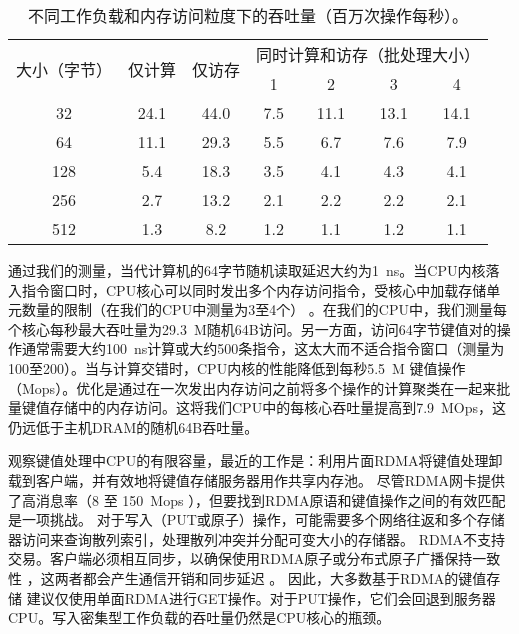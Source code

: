\begin{table}[htbp]
	\small
	\centering
	\label{kvdirect:tab:tput-unroll}
	\begin{tabular}{|c|c|c|c|c|c|c|}
		\hline
		\multirow{2}{*}{大小（字节）} & \multirow{2}{*}{仅计算} & \multirow{2}{*}{仅访存} & \multicolumn{4}{c|}{同时计算和访存（批处理大小）} \\\cline{4-7} 
		&  & & 1 & 2 & 3 & 4 \\\hline
		32 & 24.1 & 44.0 & 7.5 & 11.1 & 13.1 & 14.1 \\\hline
		64 & 11.1 & 29.3 & 5.5 & 6.7 & 7.6 & 7.9 \\\hline
		128 & 5.4 & 18.3 & 3.5 & 4.1 & 4.3 & 4.1 \\\hline
		256 & 2.7 & 13.2 & 2.1 & 2.2 & 2.2 & 2.1 \\\hline
		512 & 1.3 & 8.2 & 1.2 & 1.1 & 1.2 & 1.1 \\\hline
	\end{tabular}
	\caption{不同工作负载和内存访问粒度下的吞吐量（百万次操作每秒）。}
	\label{kvdirect:tab:kv-cpu-throughput}
\end{table}

通过我们的测量，当代计算机的64字节随机读取延迟大约为1~ns。当CPU内核落入指令窗口时，CPU核心可以同时发出多个内存访问指令，受核心中加载存储单元数量的限制（在我们的CPU中测量为3至4个） \cite {gharachorloo1992hiding,han2010packetshader,zhang2015mega}。在我们的CPU中，我们测量每个核心每秒最大吞吐量为29.3~M随机64B访问。另一方面，访问64字节键值对的操作通常需要大约100~ns计算或大约500条指令，这太大而不适合指令窗口（测量为100至200）。当与计算交错时，CPU内核的性能降低到每秒5.5~M 键值操作（Mops）。优化是通过在一次发出内存访问之前将多个操作的计算聚类在一起来批量键值存储中的内存访问\cite {li2016full,narula2014phase}。这将我们CPU中的每核心吞吐量提高到7.9~MOps，这仍远低于主机DRAM的随机64B吞吐量。

观察键值处理中CPU的有限容量，最近的工作是：利用片面RDMA将键值处理卸载到客户端，并有效地将键值存储服务器用作共享内存池。
尽管RDMA网卡提供了高消息率（8 至 150~Mops \cite {kalia2016design}），但要找到RDMA原语和键值操作之间的有效匹配是一项挑战。
对于写入（PUT或原子）操作，可能需要多个网络往返和多个存储器访问来查询散列索引，处理散列冲突并分配可变大小的存储器。
RDMA不支持交易。客户端必须相互同步，以确保使用RDMA原子或分布式原子广播保持一致性 \cite{szepesi2014designing}，这两者都会产生通信开销和同步延迟 \cite {mitchell2013using,dragojevic2014farm}。
因此，大多数基于RDMA的键值存储 \cite {mitchell2013using,dragojevic2014farm,kalia2014using}建议仅使用单面RDMA进行GET操作。对于PUT操作，它们会回退到服务器CPU。写入密集型工作负载的吞吐量仍然是CPU核心的瓶颈。

